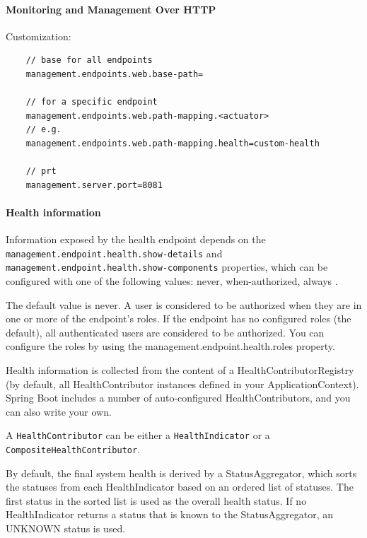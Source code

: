 \documentclass{scrartcl}
\begin{document}
\paragraph{Monitoring and Management Over HTTP}

Customization:

\begin{lstlisting}
    // base for all endpoints
    management.endpoints.web.base-path=

    // for a specific endpoint
    management.endpoints.web.path-mapping.<actuator>
    // e.g.
    management.endpoints.web.path-mapping.health=custom-health

    // prt
    management.server.port=8081
\end{lstlisting}



\paragraph{Health information}

Information exposed by the health endpoint depends on the \lstinline|management.endpoint.health.show-details| and \lstinline|management.endpoint.health.show-components| properties, which can be configured with one of the following values: never, when-authorized, always
.

The default value is never. A user is considered to be authorized when they are in one or more of the endpoint’s roles. If the endpoint has no configured roles (the default), all authenticated users are considered to be authorized. You can configure the roles by using the management.endpoint.health.roles property.

Health information is collected from the content of a HealthContributorRegistry (by default, all HealthContributor instances defined in your ApplicationContext). Spring Boot includes a number of auto-configured HealthContributors, and you can also write your own.

A \lstinline|HealthContributor| can be either a \lstinline|HealthIndicator| or a \lstinline|CompositeHealthContributor|.

By default, the final system health is derived by a StatusAggregator, which sorts the statuses from each HealthIndicator based on an ordered list of statuses. The first status in the sorted list is used as the overall health status. If no HealthIndicator returns a status that is known to the StatusAggregator, an UNKNOWN status is used.
\end{document}
